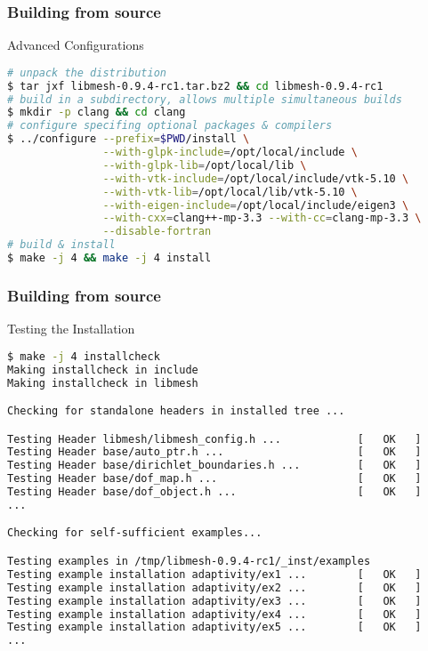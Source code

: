 \begin{frame}[fragile]
  \frametitle{Building \libMesh{} from source}

  \begin{block}{Advanced Configurations}
    \begin{lstlisting}[language=bash]
# unpack the distribution
$ tar jxf libmesh-0.9.4-rc1.tar.bz2 && cd libmesh-0.9.4-rc1
# build in a subdirectory, allows multiple simultaneous builds
$ mkdir -p clang && cd clang
# configure specifing optional packages & compilers
$ ../configure --prefix=$PWD/install \
               --with-glpk-include=/opt/local/include \
               --with-glpk-lib=/opt/local/lib \
               --with-vtk-include=/opt/local/include/vtk-5.10 \
               --with-vtk-lib=/opt/local/lib/vtk-5.10 \
               --with-eigen-include=/opt/local/include/eigen3 \
               --with-cxx=clang++-mp-3.3 --with-cc=clang-mp-3.3 \
               --disable-fortran
# build & install
$ make -j 4 && make -j 4 install
    \end{lstlisting}
  \end{block}
\end{frame}



\begin{frame}[fragile,shrink]
  \frametitle{Building \libMesh{} from source}

  \begin{block}{Testing the Installation}
    \begin{lstlisting}[language=bash]
$ make -j 4 installcheck
Making installcheck in include
Making installcheck in libmesh

Checking for standalone headers in installed tree ...

Testing Header libmesh/libmesh_config.h ...            [   OK   ]
Testing Header base/auto_ptr.h ...                     [   OK   ]
Testing Header base/dirichlet_boundaries.h ...         [   OK   ]
Testing Header base/dof_map.h ...                      [   OK   ]
Testing Header base/dof_object.h ...                   [   OK   ]
...

Checking for self-sufficient examples...

Testing examples in /tmp/libmesh-0.9.4-rc1/_inst/examples
Testing example installation adaptivity/ex1 ...        [   OK   ]
Testing example installation adaptivity/ex2 ...        [   OK   ]
Testing example installation adaptivity/ex3 ...        [   OK   ]
Testing example installation adaptivity/ex4 ...        [   OK   ]
Testing example installation adaptivity/ex5 ...        [   OK   ]
...
    \end{lstlisting}
  \end{block}
\end{frame}



